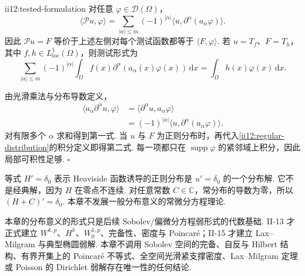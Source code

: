 \begin{FAProposition}[B][分布意义的方程的测试函数形式]{ii12:tested-formulation}
对任意 \(\displaystyle\varphi\in\mathcal D(\Omega)\)，
\[
\langle\mathcal Pu,\varphi\rangle
=
\sum_{|\alpha|\leqslant m}
(-1)^{|\alpha|}
\langle u,\partial^\alpha(a_\alpha\varphi)\rangle.
\]
因此 \(\displaystyle\mathcal Pu=F\) 等价于上述左侧对每个测试函数都等于 \(\displaystyle\langle F,\varphi\rangle\). 若 \(\displaystyle u=T_f\)、\(\displaystyle F=T_h\)，其中 \(\displaystyle f,h\in L^1_{\mathrm{loc}}(\Omega)\)，则测试形式为
\[
\sum_{|\alpha|\leqslant m}
(-1)^{|\alpha|}
\int_\Omega f(x)\partial^\alpha(a_\alpha(x)\varphi(x))\,\mathrm{d}x
=
\int_\Omega h(x)\varphi(x)\,\mathrm{d}x.
\]
\end{FAProposition}

\begin{FAProof}
由光滑乘法与分布导数定义，
\[
\begin{aligned}
\langle a_\alpha\partial^\alpha u,\varphi\rangle
&=
\langle\partial^\alpha u,a_\alpha\varphi\rangle\\
&=
(-1)^{|\alpha|}\langle u,\partial^\alpha(a_\alpha\varphi)\rangle.
\end{aligned}
\]
对有限多个 \(\displaystyle\alpha\) 求和得到第一式. 当 \(\displaystyle u\) 与 \(\displaystyle F\) 为正则分布时，再代入\autoref{ii12:regular-distribution}的积分定义即得第二式. 每一项都只在 \(\displaystyle\operatorname{supp}\varphi\) 的紧邻域上积分，因此局部可积性足够.
\hfill\(\square\)
\end{FAProof}

\begin{FAApplication}
等式 \(\displaystyle H'=\delta_0\) 表示 Heaviside 函数诱导的正则分布是 \(\displaystyle u'=\delta_0\)
的一个分布解. 它不是经典解，因为 \(\displaystyle H\) 在零点不连续. 对任意常数 \(\displaystyle C\in\mathbb C\)，常分布的导数为零，所以 \(\displaystyle (H+C)'=\delta_0.\)
本章不发展一般分布意义的常微分方程理论.
\end{FAApplication}

\begin{FAWarning}
本章的分布意义的形式只是后续 Sobolev/偏微分方程弱形式的代数基础. II-13 才正式建立 \(\displaystyle W^{k,p}\)、\(\displaystyle H^k\)、\(\displaystyle W_0^{1,p}\)、完备性、密度与 Poincaré；II-15 才建立 Lax--Milgram 与典型椭圆弱解. 本章不调用 Sobolev 空间的完备、自反与 Hilbert 结构、有界开集上的 Poincaré 不等式、全空间光滑紧支撑密度、Lax--Milgram 定理或 Poisson 的 Dirichlet 弱解存在唯一性的任何结论.
\end{FAWarning}

